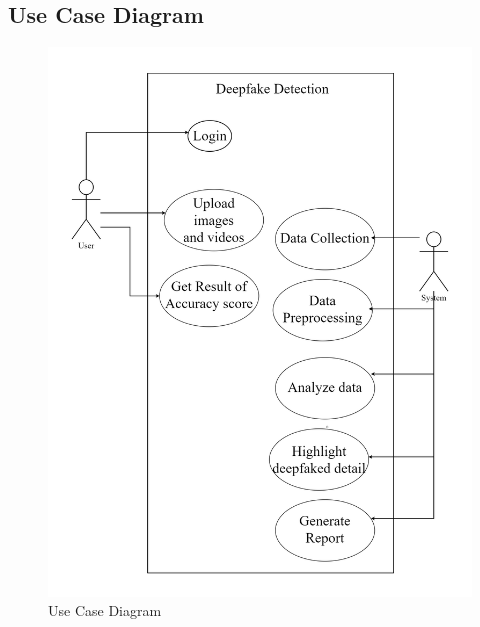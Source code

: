 
\subsection{Use Case Diagram}
\begin{figure}[h]
    \centering
    \includegraphics[width= 5in ]{img/usecasediagram.drawio.png}
    \caption{Use Case Diagram}
\end{figure}